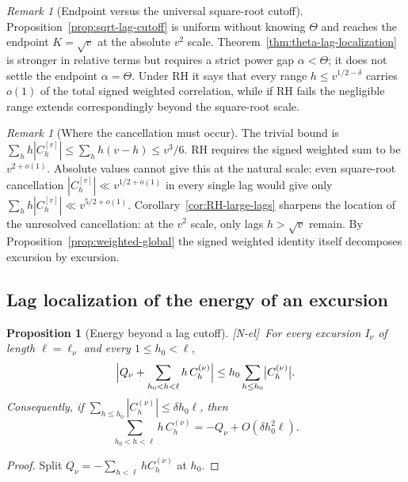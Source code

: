 \documentclass[11pt,reqno]{amsart}
\numberwithin{equation}{section}
\theoremstyle{plain}
\newtheorem{proposition}[theorem]{Proposition}
\theoremstyle{definition}
\theoremstyle{remark}
\newtheorem{remark}[theorem]{Remark}
\newcommand{\tagNE}{\textup{[N-el]}}
\begin{document}
\begin{remark}[Endpoint versus the universal square-root cutoff]
\label{rem:theta-vs-sqrt-cutoff}
Proposition~\ref{prop:sqrt-lag-cutoff} is uniform without knowing $\Theta$
and reaches the endpoint $K=\sqrt v$ at the absolute $v^2$ scale.
Theorem~\ref{thm:theta-lag-localization} is stronger in relative terms but
requires a strict power gap $\alpha<\Theta$; it does not settle the endpoint
$\alpha=\Theta$.  Under RH it says that every range
$h\le v^{1/2-\delta}$ carries $o(1)$ of the total signed weighted correlation, while if RH
fails the negligible range extends correspondingly beyond the square-root
scale.
\end{remark}

\begin{remark}[Where the cancellation must occur]
\label{rem:cross-lag}
The trivial bound is $\sum_hh|C^{[v]}_h|\le\sum_hh(v-h)\le v^3/6$.
RH requires the signed weighted sum to be $v^{2+o(1)}$. Absolute values
cannot give this at the natural scale: even square-root cancellation
$|C^{[v]}_h|\ll v^{1/2+o(1)}$ in every single lag would give only
$\sum_hh|C^{[v]}_h|\ll v^{5/2+o(1)}$. Corollary~\ref{cor:RH-large-lags}
sharpens the location of the unresolved cancellation: at the $v^2$ scale,
only lags $h>\sqrt v$ remain. By Proposition~\ref{prop:weighted-global} the
signed weighted identity itself decomposes excursion by excursion.
\end{remark}

\subsection{Lag localization of the energy of an excursion}

\begin{proposition}[Energy beyond a lag cutoff]
\label{prop:lag-localization}
\tagNE\ For every excursion $I_\nu$ of length $\ell=\ell_\nu$ and every
$1\le h_0<\ell$,
\begin{equation}
\Bigl|Q_\nu+\sum_{h_0<h<\ell}h\,C^{(\nu)}_h\Bigr|
\le h_0\sum_{h\le h_0}\bigl|C^{(\nu)}_h\bigr| .
\end{equation}
Consequently, if $\sum_{h\le h_0}|C^{(\nu)}_h|\le\delta h_0\ell$, then
\begin{equation}
\sum_{h_0<h<\ell}h\,C^{(\nu)}_h
=-Q_\nu+O(\delta h_0^2\ell).
\end{equation}
\end{proposition}

\begin{proof}
Split $Q_\nu=-\sum_{h<\ell}hC^{(\nu)}_h$ at $h_0$.
\end{proof}
\end{document}

